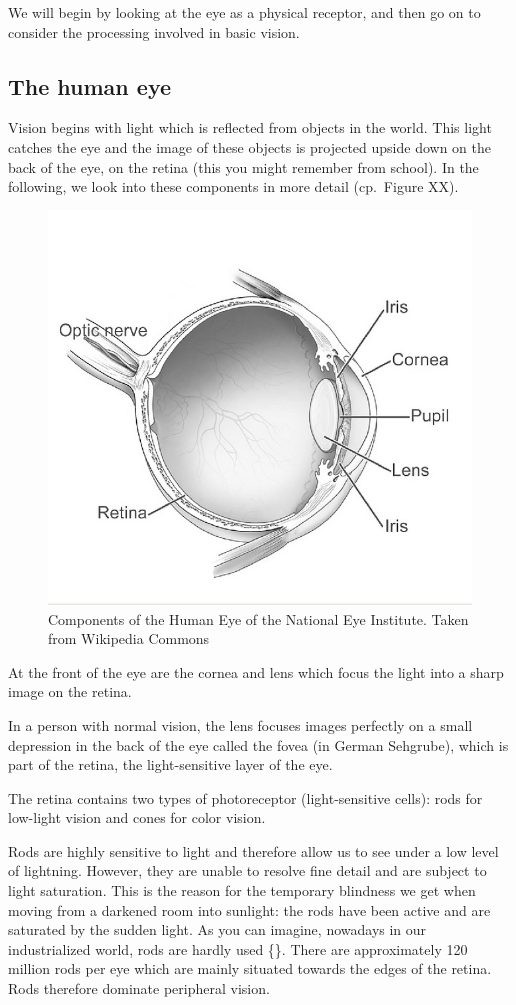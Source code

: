\documentclass[
]{book}
\begin{document}
We will begin by looking at the eye as a physical receptor, and then go on to consider the processing involved in basic vision.

\hypertarget{the-human-eye}{%
\subsection{The human eye}\label{the-human-eye}}

Vision begins with light which is reflected from objects in the world. This light catches the eye and the image of these objects is projected upside down on the back of the eye, on the retina (this you might remember from school). In the following, we look into these components in more detail (cp.~Figure XX).

\begin{figure}

{\centering \includegraphics[width=0.5\linewidth]{images/humaneye} 

}

\caption{Components of the Human Eye of the National Eye Institute. Taken from Wikipedia Commons}\label{fig:unnamed-chunk-8}
\end{figure}

At the front of the eye are the cornea and lens which focus the light into a sharp image on the retina.

In a person with normal vision, the lens focuses images perfectly on a small depression in the back of the eye called the fovea (in German Sehgrube), which is part of the retina, the light-sensitive layer of the eye.

The retina contains two types of photoreceptor (light-sensitive cells): rods for low-light vision and cones for color vision.

Rods are highly sensitive to light and therefore allow us to see under a low level of lightning. However, they are unable to resolve fine detail and are subject to light saturation. This is the reason for the temporary blindness we get when moving from a darkened room into sunlight: the rods have been active and are saturated by the sudden light. As you can imagine, nowadays in our industrialized world, rods are hardly used \{\citet{Johnson2014designingwiththemind}\}. There are approximately 120 million rods per eye which are mainly situated towards the edges of the retina. Rods therefore dominate peripheral vision.
\end{document}

